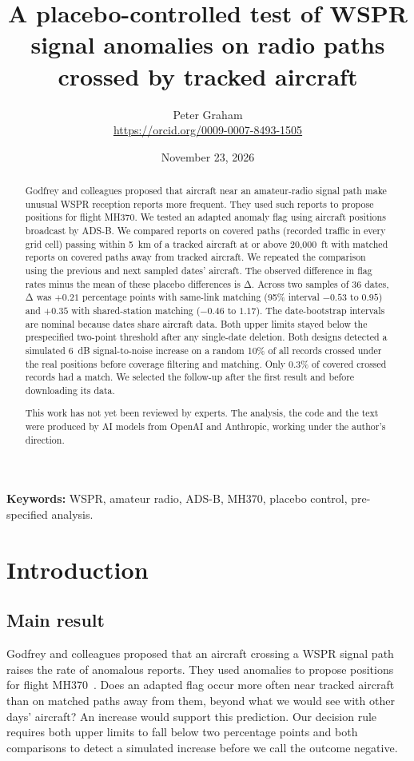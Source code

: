 \documentclass[11pt]{article}
\title{A placebo-controlled test of WSPR signal anomalies on radio paths crossed by tracked aircraft}
\author{Peter Graham\\ \small\url{https://orcid.org/0009-0007-8493-1505}}
\date{November 23, 2026}
\begin{document}
\maketitle
\begin{abstract}
Godfrey and colleagues proposed that aircraft near an amateur-radio signal path make unusual WSPR reception reports more frequent. They used such reports to propose positions for flight MH370. We tested an adapted anomaly flag using aircraft positions broadcast by ADS-B. We compared reports on covered paths (recorded traffic in every grid cell) passing within 5~km of a tracked aircraft at or above 20{,}000~ft with matched reports on covered paths away from tracked aircraft. We repeated the comparison using the previous and next sampled dates' aircraft. The observed difference in flag rates minus the mean of these placebo differences is Δ. Across two samples of 36 dates, Δ was $+0.21$ percentage points with same-link matching (95\% interval $-0.53$ to $0.95$) and $+0.35$ with shared-station matching ($-0.46$ to $1.17$). The date-bootstrap intervals are nominal because dates share aircraft data. Both upper limits stayed below the prespecified two-point threshold after any single-date deletion. Both designs detected a simulated 6~dB signal-to-noise increase on a random 10\% of all records crossed under the real positions before coverage filtering and matching. Only 0.3\% of covered crossed records had a match. We selected the follow-up after the first result and before downloading its data.

This work has not yet been reviewed by experts.
The analysis, the code and the text were produced by AI models from OpenAI and Anthropic, working under the author's direction.
\end{abstract}
\medskip
\noindent\textbf{Keywords:} WSPR, amateur radio, ADS-B, MH370, placebo control, pre-specified analysis.

\section{Introduction}

\subsection{Main result}

Godfrey and colleagues proposed that an aircraft crossing a WSPR signal path raises the rate of anomalous reports. They used anomalies to propose positions for flight MH370~\cite{oefgr,mh370fpa}. Does an adapted flag occur more often near tracked aircraft than on matched paths away from them, beyond what we would see with other days' aircraft? An increase would support this prediction. Our decision rule requires both upper limits to fall below two percentage points and both comparisons to detect a simulated increase before we call the outcome negative.
\end{document}
